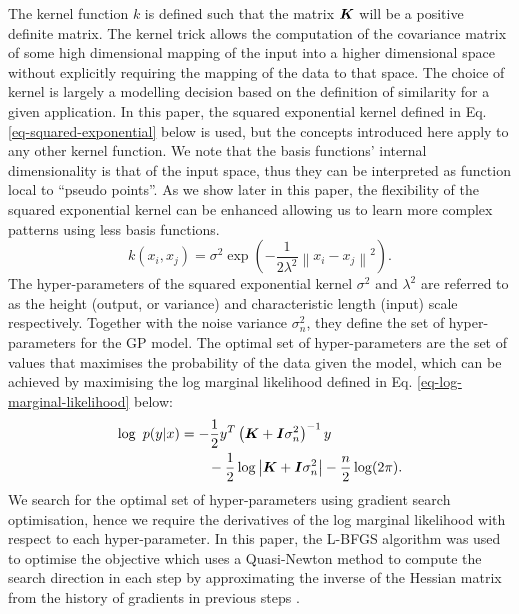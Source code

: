 \documentclass[useAMS,usenatbib,fleqn]{mn2e}
\begin{document}
The kernel function $k$ is defined such that the matrix $\bmath{K}$ will be a positive definite matrix. The kernel trick allows the computation of the covariance matrix of some high dimensional mapping of the input into a higher dimensional space without explicitly requiring the mapping of the data to that space. The choice of kernel is largely a modelling decision based on the definition of similarity for a given application. In this paper, the squared exponential kernel defined in  Eq. \eqref{eq-squared-exponential} below is used, but the concepts introduced here apply to any other kernel function. We note that the basis functions' internal dimensionality is that of the input space, thus they can be interpreted as function local to ``pseudo points''. As we show later in this paper, the flexibility of the squared exponential kernel can be enhanced allowing us to learn more complex patterns using less basis functions.
\begin{equation}
\label{eq-squared-exponential}
k(x_{i},x_{j}) = \sigma^{2} \exp \left ( -\frac{1} {2\lambda^{2}} \left \|x_{i}-x_{j}\right\|^{2}\right ).
\end{equation}
The hyper-parameters of the squared exponential kernel $\sigma^{2}$ and $\lambda^{2}$ are referred to as the height (output, or variance) and characteristic length (input) scale respectively. Together with the noise variance $\sigma_{n}^{2}$, they define the set of hyper-parameters for the GP model. The optimal set of hyper-parameters are the set of values that maximises the probability of the data given the model, which can be achieved by maximising the log marginal likelihood defined in Eq. \eqref{eq-log-marginal-likelihood} below:
\begin{align}
\label{eq-log-marginal-likelihood}
\log\text{ }p(y|x) &= -\frac{1}{2}y^{T}\left(\bmath{K}+\bmath{I}\sigma_{n}^{2} \right)^{-1}y \nonumber \\
&\qquad -\frac{1}{2} \log\left | \bmath{K}+\bmath{I}\sigma_{n}^{2}\right|-\frac{n}{2}\log(2\pi).
\end{align}
We search for the optimal set of hyper-parameters using gradient search optimisation, hence we require the derivatives of the log marginal likelihood with respect to each hyper-parameter. In this paper, the L-BFGS algorithm was used to optimise the objective which uses a Quasi-Newton method to compute the search direction in each step by approximating the inverse of the Hessian matrix from the history of gradients in previous steps \citep{jorge1980}.
\end{document}
